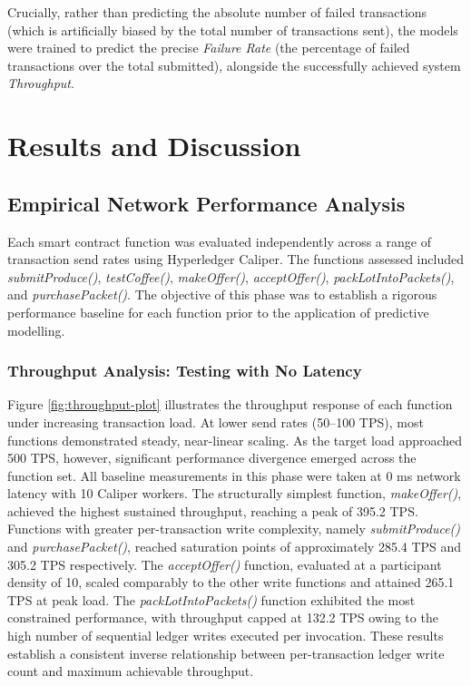 ﻿\documentclass[12pt]{article}
\begin{document}
Crucially, rather than predicting the absolute number of failed transactions (which is artificially biased by the total number of transactions sent), the models were trained to predict the precise \textit{Failure Rate} (the percentage of failed transactions over the total submitted), alongside the successfully achieved system \textit{Throughput}.



\section{Results and Discussion}
\subsection{Empirical Network Performance Analysis}
Each smart contract function was evaluated independently across a range of transaction send rates using Hyperledger Caliper. The functions assessed included \textit{submitProduce()}, \textit{testCoffee()}, \textit{makeOffer()}, \textit{acceptOffer()}, \textit{packLotIntoPackets()}, and \textit{purchasePacket()}. The objective of this phase was to establish a rigorous performance baseline for each function prior to the application of predictive modelling.

\subsubsection{Throughput Analysis: Testing with No Latency}
Figure \ref{fig:throughput-plot} illustrates the throughput response of each function under increasing transaction load. At lower send rates (50--100 TPS), most functions demonstrated steady, near-linear scaling. As the target load approached 500 TPS, however, significant performance divergence emerged across the function set. All baseline measurements in this phase were taken at 0 ms network latency with 10 Caliper workers. The structurally simplest function, \textit{makeOffer()}, achieved the highest sustained throughput, reaching a peak of 395.2 TPS. Functions with greater per-transaction write complexity, namely \textit{submitProduce()} and \textit{purchasePacket()}, reached saturation points of approximately 285.4 TPS and 305.2 TPS respectively. The \textit{acceptOffer()} function, evaluated at a participant density of 10, scaled comparably to the other write functions and attained 265.1 TPS at peak load. The \textit{packLotIntoPackets()} function exhibited the most constrained performance, with throughput capped at 132.2 TPS owing to the high number of sequential ledger writes executed per invocation. These results establish a consistent inverse relationship between per-transaction ledger write count and maximum achievable throughput.
\end{document}
